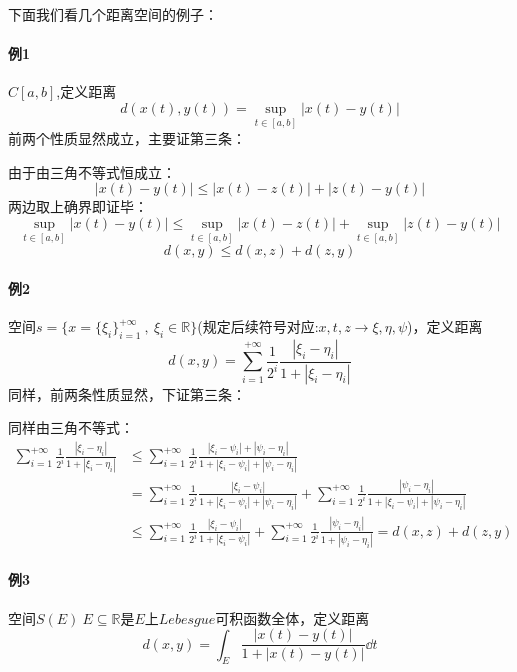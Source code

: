 下面我们看几个距离空间的例子：
\paragraph*{例1} \quad $C[a,b]$,定义距离
\[d(x(t),y(t))=\mathop{\text{sup}}\limits_{t \in [a,b]}\left|x(t)-y(t)\right|\]
前两个性质显然成立，主要证第三条：

由于由三角不等式恒成立：
\[\left|x(t)-y(t)\right| \leq \left|x(t)-z(t)\right|+\left|z(t)-y(t)\right|\]
两边取上确界即证毕：
\[\mathop{\text{sup}}\limits_{t \in [a,b]}\left|x(t)-y(t)\right| \leq \mathop{\text{sup}}\limits_{t \in [a,b]}\left|x(t)-z(t)\right|+\mathop{\text{sup}}\limits_{t \in [a,b]}\left|z(t)-y(t)\right|\]
\[d(x,y) \leq d(x,z)+d(z,y)\]

\paragraph*{例2} \quad 空间$s=\{x=\{\xi_i\}_{i=1}^{+\infty} \ , \ \xi_i \in \mathbb{R}\}$(规定后续符号对应:$x,t,z \rightarrow \xi,\eta,\psi$)，定义距离
\[d(x,y)=\sum_{i=1}^{+\infty}\frac{1}{2^i}\frac{|\xi_i-\eta_i|}{1+|\xi_i-\eta_i|}\]
同样，前两条性质显然，下证第三条：

同样由三角不等式：
\begin{equation*}
    \begin{aligned}
        \sum_{i=1}^{+\infty}\frac{1}{2^i}\frac{|\xi_i-\eta_i|}{1+|\xi_i-\eta_i|} & \leq \sum_{i=1}^{+\infty}\frac{1}{2^i}\frac{\left|\xi_i-\psi_i\right|+\left|\psi_i-\eta_i\right|}{1+\left|\xi_i-\psi_i\right|+\left|\psi_i-\eta_i\right|} \\
        & =\sum_{i=1}^{+\infty}\frac{1}{2^i}\frac{\left|\xi_i-\psi_i\right|}{1+\left|\xi_i-\psi_i\right|+\left|\psi_i-\eta_i\right|}+\sum_{i=1}^{+\infty}\frac{1}{2^i}\frac{\left|\psi_i-\eta_i\right|}{1+\left|\xi_i-\psi_i\right|+\left|\psi_i-\eta_i\right|} \\
        & \leq \sum_{i=1}^{+\infty}\frac{1}{2^i}\frac{\left|\xi_i-\psi_i\right|}{1+\left|\xi_i-\psi_i\right|}+\sum_{i=1}^{+\infty}\frac{1}{2^i}\frac{\left|\psi_i-\eta_i\right|}{1+\left|\psi_i-\eta_i\right|}=d(x,z)+d(z,y)
    \end{aligned}
\end{equation*}
\paragraph*{例3} \quad 空间$S(E) \ E \subseteq \mathbb{R}$是$E$上$Lebesgue$可积函数全体，定义距离
\[d(x,y)=\int_E\frac{\left|x(t)-y(t)\right|}{1+\left|x(t)-y(t)\right|}\dd t\]

